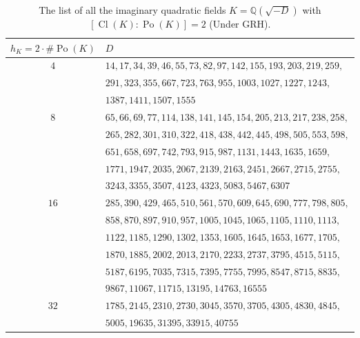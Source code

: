 \documentclass[12pt]{amsart}
\theoremstyle{definition}
\numberwithin{equation}{section}
\DeclareMathOperator{\Po}{Po}
\DeclareMathOperator{\Cl}{Cl}
\begin{document}
{	\begin{table}[!h]
	\begin{center}
		\begin{tabular}{|c|p{10.2cm}|} 
			\hline
			$h_K=2\cdot\#\Po(K)$ & $D$   \\ [0.5ex] 
			\hline \hline
			\multirow{3}{0.6em}{$4$} & 
			$14,17,34,39,46,55,73,82,97,142,155,193,203,219,259,$ \\ 
			& $291,323,355,667,723,763,955,1003,1027,1227,1243,$ \\ 
			& $1387,1411,1507,1555$ \\ 
			\hline 
			\multirow{5}{0.6em}{$8$} & 
			$65,66,69,77,114,138,141,145,154,205,213,217,238,258,$ \\ 
			& $265,282,301,310,322,418,438,442,445,498,505,553,598,$ \\ 
			& $651,658,697,742,793,915,987,1131,1443,1635,1659,$ \\ 
			& $1771,1947,2035,2067,2139,2163,2451,2667,2715,2755,$ \\
			& $3243,3355,3507,4123,4323,5083,5467,6307$ \\
			\hline 
			\multirow{6}{0.6em}{$16$} & 
			$285,390,429,465,510,561,570,609,645,690,777,798,805,$ \\
			& $858,870,897,910,957,1005,1045,1065,1105,1110,1113,$ \\
			& $1122,1185,1290,1302,1353,1605,1645,1653,1677,1705,$ \\
			& $1870,1885,2002,2013,2170,2233,2737,3795,4515,5115,$ \\
			& $5187,6195,7035,7315,7395,7755,7995,8547,8715,8835,$ \\
			& $9867,11067,11715,13195,14763,16555$ \\
			\hline 
			\multirow{2}{0.6em}{$32$} & 
			$1785,2145,2310,2730,3045,3570,3705,4305,4830,4845,$	\\ 
			& $5005,19635,31395,33915,40755$ \\
			\hline 
		\end{tabular} \caption{The list of all the imaginary quadratic fields $K=\mathbb{Q}(\sqrt{-D})$ with $\left[\Cl(K):\Po(K)\right]=2$ (Under GRH).}
\label{tab, imaginiary quadratic t=2}
	\end{center}
\end{table}



}
\end{document}
